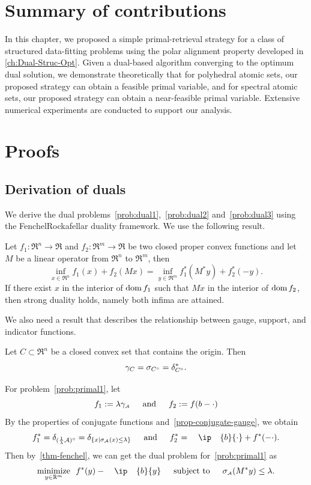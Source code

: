 \section{Summary of contributions}

In this chapter, we proposed a simple primal-retrieval strategy for a class of structured data-fitting problems using the polar alignment property developed in \autoref{ch:Dual-Struc-Opt}. Given a dual-based algorithm converging to the optimum dual solution, we demonstrate theoretically that for polyhedral atomic sets, our proposed strategy can obtain a feasible primal variable, and for spectral atomic sets, our proposed strategy can obtain a near-feasible primal variable. Extensive numerical experiments are conducted to support our analysis. 



\section{Proofs}

\subsection{Derivation of duals}\label{app:duals}

We derive the dual problems~\eqref{prob:dual1},~\eqref{prob:dual2} and~\eqref{prob:dual3} using the Fenchel\textendash Rockafellar duality framework. We use the following result.
\begin{theorem}\label{thm-fenchel}
  Let $f_1:\Re^n\to\Re$ and $f_2:\Re^m\to\Re$ be two closed proper convex functions and let $M$ be a linear operator from $\Re^n$ to $\Re^m$, then
  \[\inf_{x \in \Re^n} f_1(x) + f_2(Mx) = \inf_{y \in \Re^m} f_1^*(M^*y) + f_2^*(-y).\]
  If there exist $x$ in the interior of $\operatorname{dom} f_1$ such that $Mx$ in the interior of $\operatorname{dom} f_2$, then strong duality holds, namely both infima are attained. 
\end{theorem}
We also need a result that describes the relationship between gauge, support, and indicator functions. 
\begin{proposition} \label{prop-conjugate-gauge}
  Let $C\subset\Re^n$ be a closed convex set that contains the origin. Then 
  \[\gamma_C = \sigma_{C^\circ}=\delta_{C^\circ}^*.\]
\end{proposition}

For problem~\eqref{prob:primal1}, let
\[
  f_1 := \lambda\gamma_{\scriptscriptstyle\mathcal{A}} \enspace\hbox{\quad and\quad}\enspace f_2 := f(b - \cdot)
\]
By the properties of conjugate functions and~\autoref{prop-conjugate-gauge}, we obtain 
\[
  f_1^* =  \delta_{(\frac{1}{\lambda}\Ascr)^\circ} = \delta_{\{x\mid \sigma\As(x)\leq\lambda\}} \enspace\text{and}\enspace f_2^* = \ip{b}{\cdot} + f^*(-\cdot).
\]
Then by~\autoref{thm-fenchel}, we can get the dual problem for~\eqref{prob:primal1} as
\[\minimize{y\in\Re^m} f^*(y) - \ip{b}{y} \enspace\text{subject to}\enspace \sigma\As(M^*y)\leq\lambda.\]

